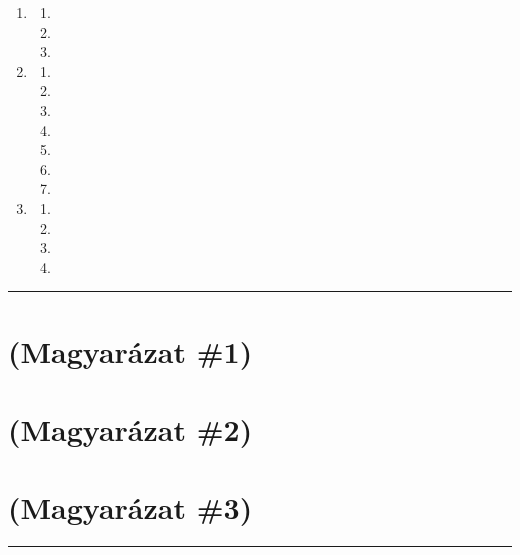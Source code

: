 \documentclass[]{report}
\providecommand{\tightlist}{%
  \setlength{\itemsep}{0pt}\setlength{\parskip}{0pt}}
\newenvironment{expl}[0]%
  {\rule{\textwidth}{.2pt}\footnotesize}%
  {\rule{\textwidth}{.2pt}\normalsize}
\begin{document}
\begin{enumerate}
\item

  \begin{enumerate}
  \item
  
  \item
  
  \item
  
  \end{enumerate}
\item

  \begin{enumerate}
  \item
  
  \item
  
  \item
  
  \item
  
  \item
  
  \item
  
  \item
  
  \end{enumerate}
\item

  \begin{enumerate}
  \tightlist
  \item
  
  \item
  
  \item
  
  \item
  
  \end{enumerate}
\end{enumerate}

\begin{expl}
\section*{(Magyarázat \#1)}


\section*{(Magyarázat \#2)}


\section*{(Magyarázat \#3)}

\end{expl}






\end{document}
